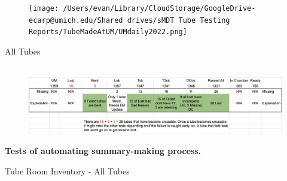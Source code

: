 \documentclass{beamer}
\begin{document}
		\begin{frame}
			\begin{figure}
				\texttt{[image: /Users/evan/Library/CloudStorage/GoogleDrive-ecarp@umich.edu/Shared drives/sMDT Tube Testing Reports/TubeMadeAtUM/UMdaily2022.png]}
			\end{figure}
		\end{frame}
\appendix
\begin{frame}{All Tubes}
	\begin{figure}
		\centering
		\scalebox{0.6}{}
		\\
		\vspace{0.5cm}
		\includegraphics[width=0.8\pdfpagewidth]{UMMissingTubeExplanation.png}
	\end{figure}
	
\end{frame}
	\begin{frame}
		\centering\bf Tests of automating summary-making process.
	\end{frame}
	\begin{frame}{Tube Room Inventory - All Tubes}
		\begin{figure}
			\centering
			\scalebox{0.6}{}
		\end{figure}
	\end{frame}
	
\end{document}
